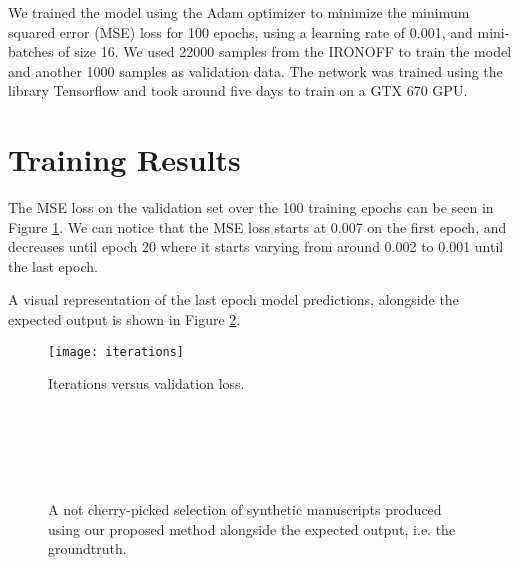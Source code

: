 We trained the model using the Adam optimizer to minimize the minimum squared error (MSE) loss for 100 epochs, using a learning rate of 0.001, and mini-batches of size 16. We used 22000 samples from the IRONOFF to train the model and another 1000 samples as validation data. The network was trained using the library Tensorflow and took around five days to train on a GTX 670 GPU.

\section{Training Results}
The MSE loss on the validation set over the 100 training epochs can be seen in Figure \ref{fig:trainingMSE}. We can notice that the MSE loss starts at 0.007 on the first epoch, and decreases until epoch 20 where it starts varying from around 0.002 to 0.001 until the last epoch. 

A visual representation of the last epoch model predictions, alongside the expected output is shown in Figure \ref{fig:resultingsamples}. 
\begin{figure}[!htb]
\centering
\texttt{[image: iterations]}

\caption{Iterations versus validation loss.}
\label{fig:trainingMSE}

\end{figure}

\begin{figure}[!htpb]
\centering
{} 
\hspace*{0.4in} %
\\
\hspace*{0.4in} %
\\
\hspace*{0.4in} %
\\
\hspace*{0.4in} %
\\
\addtocounter{subfigure}{-8}
\hspace*{0.4in} %


\caption{A not cherry-picked selection of synthetic manuscripts produced using our proposed method alongside the expected output, i.e. the groundtruth.} \label{fig:resultingsamples}
\end{figure}

